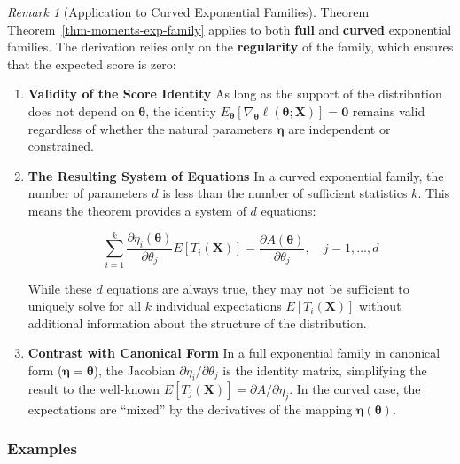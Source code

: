 \documentclass[
  letterpaper,
  DIV=11,
  numbers=noendperiod]{scrreprt}
\renewcommand{\[}{\begin{equation}}
\renewcommand{\]}{\end{equation}}
\theoremstyle{definition}
\theoremstyle{plain}
\theoremstyle{plain}
\theoremstyle{plain}
\theoremstyle{definition}
\theoremstyle{plain}
\theoremstyle{remark}
\newtheorem{refremark}{Remark}[chapter]
\begin{document}
\begin{refremark}[Application to Curved Exponential Families]
Theorem Theorem~\ref{thm-moments-exp-family} applies to both
\textbf{full} and \textbf{curved} exponential families. The derivation
relies only on the \textbf{regularity} of the family, which ensures that
the expected score is zero:

\begin{enumerate}
\def\labelenumi{\arabic{enumi}.}
\item
  \textbf{Validity of the Score Identity} As long as the support of the
  distribution does not depend on \(\boldsymbol{\theta}\), the identity
  \(E_{\boldsymbol{\theta}}[\nabla_{\boldsymbol{\theta}} \ell(\boldsymbol{\theta}; \mathbf{X})] = \mathbf{0}\)
  remains valid regardless of whether the natural parameters
  \(\boldsymbol{\eta}\) are independent or constrained.
\item
  \textbf{The Resulting System of Equations} In a curved exponential
  family, the number of parameters \(d\) is less than the number of
  sufficient statistics \(k\). This means the theorem provides a system
  of \(d\) equations:

  \[
  \sum_{i=1}^k \frac{\partial \eta_i(\boldsymbol{\theta})}{\partial \theta_j} E[T_i(\mathbf{X})] = \frac{\partial A(\boldsymbol{\theta})}{\partial \theta_j}, \quad j = 1, \dots, d
  \]

  While these \(d\) equations are always true, they may not be
  sufficient to uniquely solve for all \(k\) individual expectations
  \(E[T_i(\mathbf{X})]\) without additional information about the
  structure of the distribution.
\item
  \textbf{Contrast with Canonical Form} In a full exponential family in
  canonical form (\(\boldsymbol{\eta} = \boldsymbol{\theta}\)), the
  Jacobian \(\partial \eta_i / \partial \theta_j\) is the identity
  matrix, simplifying the result to the well-known
  \(E[T_j(\mathbf{X})] = \partial A / \partial \eta_j\). In the curved
  case, the expectations are ``mixed'' by the derivatives of the mapping
  \(\boldsymbol{\eta}(\boldsymbol{\theta})\).
\end{enumerate}

\label{rem-curved-moments}

\end{refremark}

\subsubsection{Examples}\label{examples-2}
\end{document}
